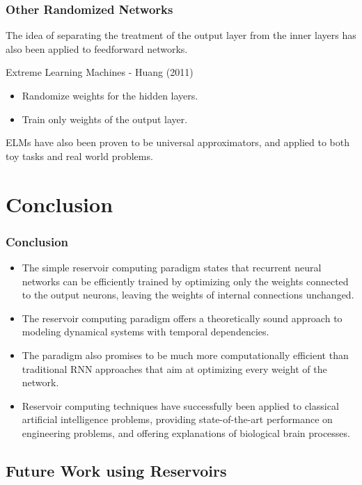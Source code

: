 \documentclass{beamer}
\begin{document}
\begin{frame}
\frametitle{Other Randomized Networks}
The idea of separating the treatment of the output layer from the inner layers has also been applied to feedforward networks.

\begin{block}{Extreme Learning Machines - Huang (2011)}
\begin{itemize}
\item Randomize weights for the hidden layers.
\item Train only weights of the output layer.
\end{itemize}
\end{block}
ELMs have also been proven to be universal approximators, and applied to both toy tasks and real world problems.

\end{frame}


\section{Conclusion}

\begin{frame}
\frametitle{Conclusion}
\begin{itemize}
\item The simple reservoir computing paradigm states that recurrent neural networks can be efficiently trained by optimizing only the weights connected to the output neurons, leaving the weights of internal connections unchanged. 
\item The reservoir computing paradigm offers a theoretically sound approach to modeling dynamical systems with temporal dependencies. 
\item The paradigm also promises to be much more computationally efficient than traditional RNN approaches that aim at optimizing every weight of the network.
\item Reservoir computing techniques have successfully been applied to classical artificial intelligence problems, providing state-of-the-art performance on engineering problems, and offering explanations of biological brain processes.
\end{itemize}

\end{frame}

\subsection{Future Work using Reservoirs}
\end{document}
